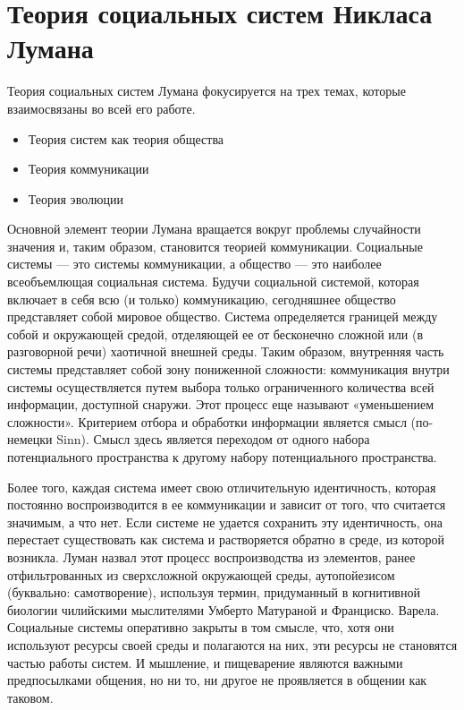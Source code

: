 \documentclass[a4page]{article}
\begin{document}
\newpage
\section{Теория социальных систем Никласа Лумана}
Теория социальных систем Лумана фокусируется на трех темах, которые взаимосвязаны во всей его работе\cite{systemctheorie}.

\begin{itemize}
     \item Теория систем как теория общества
     \item Теория коммуникации
     \item Теория эволюции
\end{itemize}

Основной элемент теории Лумана вращается вокруг проблемы случайности значения и, таким образом, становится теорией коммуникации. Социальные системы — это системы коммуникации, а общество — это наиболее всеобъемлющая социальная система. Будучи социальной системой, которая включает в себя всю (и только) коммуникацию, сегодняшнее общество представляет собой мировое общество\cite{society_as_social_sytem}. Система определяется границей между собой и окружающей средой, отделяющей ее от бесконечно сложной или (в разговорной речи) хаотичной внешней среды. Таким образом, внутренняя часть системы представляет собой зону пониженной сложности: коммуникация внутри системы осуществляется путем выбора только ограниченного количества всей информации, доступной снаружи. Этот процесс еще называют «уменьшением сложности». Критерием отбора и обработки информации является смысл (по-немецки Sinn). Смысл здесь является переходом от одного набора потенциального пространства к другому набору потенциального пространства.

Более того, каждая система имеет свою отличительную идентичность, которая постоянно воспроизводится в ее коммуникации и зависит от того, что считается значимым, а что нет. Если системе не удается сохранить эту идентичность, она перестает существовать как система и растворяется обратно в среде, из которой возникла. Луман назвал этот процесс воспроизводства из элементов, ранее отфильтрованных из сверхсложной окружающей среды, аутопойезисом (буквально: самотворение), используя термин, придуманный в когнитивной биологии чилийскими мыслителями Умберто Матураной и Франциско. Варела. Социальные системы оперативно закрыты в том смысле, что, хотя они используют ресурсы своей среды и полагаются на них, эти ресурсы не становятся частью работы систем. И мышление, и пищеварение являются важными предпосылками общения, но ни то, ни другое не проявляется в общении как таковом\cite{society_as_social_sytem}.
\end{document}
